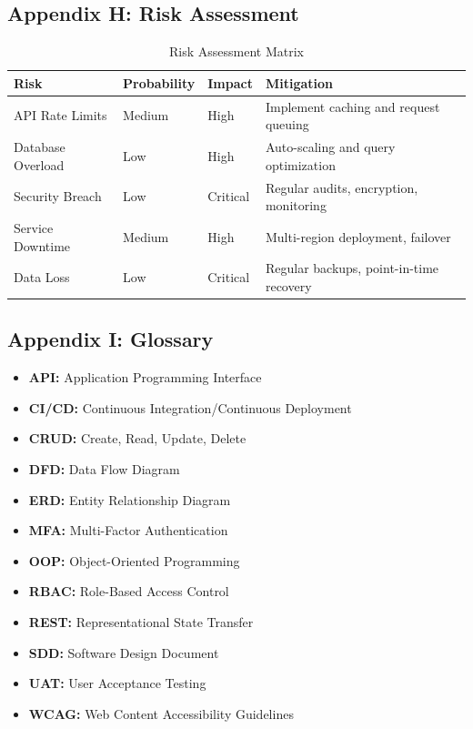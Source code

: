 \documentclass[12pt,a4paper]{article}
\begin{document}
\subsection{Appendix H: Risk Assessment}

\begin{table}[h]
\centering
\begin{tabularx}{\textwidth}{|l|l|l|X|}
\hline
\textbf{Risk} & \textbf{Probability} & \textbf{Impact} & \textbf{Mitigation}\\
\hline
API Rate Limits & Medium & High & Implement caching and request queuing\\
\hline
Database Overload & Low & High & Auto-scaling and query optimization\\
\hline
Security Breach & Low & Critical & Regular audits, encryption, monitoring\\
\hline
Service Downtime & Medium & High & Multi-region deployment, failover\\
\hline
Data Loss & Low & Critical & Regular backups, point-in-time recovery\\
\hline
\end{tabularx}
\caption{Risk Assessment Matrix}
\end{table}

\subsection{Appendix I: Glossary}

\begin{itemize}
    \item \textbf{API:} Application Programming Interface
    \item \textbf{CI/CD:} Continuous Integration/Continuous Deployment
    \item \textbf{CRUD:} Create, Read, Update, Delete
    \item \textbf{DFD:} Data Flow Diagram
    \item \textbf{ERD:} Entity Relationship Diagram
    \item \textbf{MFA:} Multi-Factor Authentication
    \item \textbf{OOP:} Object-Oriented Programming
    \item \textbf{RBAC:} Role-Based Access Control
    \item \textbf{REST:} Representational State Transfer
    \item \textbf{SDD:} Software Design Document
    \item \textbf{UAT:} User Acceptance Testing
    \item \textbf{WCAG:} Web Content Accessibility Guidelines
\end{itemize}
\end{document}
